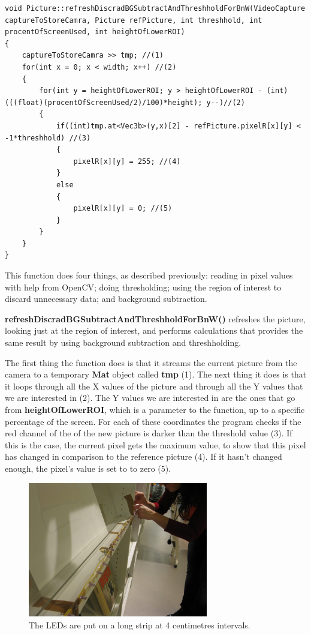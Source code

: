 \begin{lstlisting}
void Picture::refreshDiscradBGSubtractAndThreshholdForBnW(VideoCapture captureToStoreCamra, Picture refPicture, int threshhold, int procentOfScreenUsed, int heightOfLowerROI)
{
	captureToStoreCamra >> tmp; //(1)
	for(int x = 0; x < width; x++) //(2)
	{
		for(int y = heightOfLowerROI; y > heightOfLowerROI - (int)(((float)(procentOfScreenUsed/2)/100)*height); y--)//(2)
		{
			if((int)tmp.at<Vec3b>(y,x)[2] - refPicture.pixelR[x][y] < -1*threshhold) //(3)
			{
				pixelR[x][y] = 255; //(4)
			}
			else
			{
				pixelR[x][y] = 0; //(5)
			}
		}
	}
}
\end{lstlisting}
This function does four things, as described previously: reading in pixel values with help from OpenCV; doing thresholding; using the region of interest to discard unnecessary data; and background subtraction.

\textbf{refreshDiscradBGSubtractAndThreshholdForBnW()} refreshes the picture, looking just at the region of interest, and performs calculations that provides the same result by using background subtraction and threshholding.

The first thing the function does is that it streams the current picture from the camera to a temporary \textbf{Mat} object called \textbf{tmp} (1). The next thing it does is that it loops through all the X values of the picture and through all the Y values that we are interested in (2). The Y values we are interested in are the ones that go from \textbf{heightOfLowerROI}, which is a parameter to the function, up to a specific percentage of the screen. For each of these coordinates the program checks if the red channel of the of the new picture is darker than the threshold value (3). If this is the case, the current pixel gets the maximum value, to show that this pixel has changed in comparison to the reference picture (4). If it hasn't changed enough, the pixel's value is set to to zero (5).

\begin{figure}[htbp]
\centering
\includegraphics[width=0.7\textwidth]{Pictures/Design/led_max}
\caption{The LEDs are put on a long strip at 4 centimetres intervals.}
\label{fig:led_max}
\end{figure}

